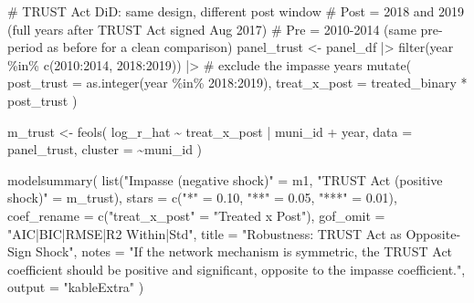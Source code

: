 \documentclass[
  11pt,
  letterpaper,
  DIV=11,
  numbers=noendperiod]{scrartcl}
\newenvironment{Shaded}{}{}
\newcommand{\AttributeTok}[1]{\textcolor[rgb]{0.84,0.23,0.29}{#1}}
\newcommand{\CommentTok}[1]{\textcolor[rgb]{0.42,0.45,0.49}{#1}}
\newcommand{\DecValTok}[1]{\textcolor[rgb]{0.00,0.36,0.77}{#1}}
\newcommand{\FloatTok}[1]{\textcolor[rgb]{0.00,0.36,0.77}{#1}}
\newcommand{\FunctionTok}[1]{\textcolor[rgb]{0.44,0.26,0.76}{#1}}
\newcommand{\NormalTok}[1]{\textcolor[rgb]{0.14,0.16,0.18}{#1}}
\newcommand{\OtherTok}[1]{\textcolor[rgb]{0.44,0.26,0.76}{#1}}
\newcommand{\SpecialCharTok}[1]{\textcolor[rgb]{0.00,0.36,0.77}{#1}}
\newcommand{\StringTok}[1]{\textcolor[rgb]{0.01,0.18,0.38}{#1}}
\begin{document}
\begin{Shaded}
\begin{Highlighting}[]
\CommentTok{\# TRUST Act DiD: same design, different post window}
\CommentTok{\# Post = 2018 and 2019 (full years after TRUST Act signed Aug 2017)}
\CommentTok{\# Pre  = 2010{-}2014 (same pre{-}period as before for a clean comparison)}
\NormalTok{panel\_trust }\OtherTok{\textless{}{-}}\NormalTok{ panel\_df }\SpecialCharTok{|\textgreater{}}
  \FunctionTok{filter}\NormalTok{(year }\SpecialCharTok{\%in\%} \FunctionTok{c}\NormalTok{(}\DecValTok{2010}\SpecialCharTok{:}\DecValTok{2014}\NormalTok{, }\DecValTok{2018}\SpecialCharTok{:}\DecValTok{2019}\NormalTok{)) }\SpecialCharTok{|\textgreater{}}  \CommentTok{\# exclude the impasse years}
  \FunctionTok{mutate}\NormalTok{(}
    \AttributeTok{post\_trust   =} \FunctionTok{as.integer}\NormalTok{(year }\SpecialCharTok{\%in\%} \DecValTok{2018}\SpecialCharTok{:}\DecValTok{2019}\NormalTok{),}
    \AttributeTok{treat\_x\_post =}\NormalTok{ treated\_binary }\SpecialCharTok{*}\NormalTok{ post\_trust}
\NormalTok{  )}

\NormalTok{m\_trust }\OtherTok{\textless{}{-}} \FunctionTok{feols}\NormalTok{(}
\NormalTok{  log\_r\_hat }\SpecialCharTok{\textasciitilde{}}\NormalTok{ treat\_x\_post }\SpecialCharTok{|}\NormalTok{ muni\_id }\SpecialCharTok{+}\NormalTok{ year,}
  \AttributeTok{data    =}\NormalTok{ panel\_trust,}
  \AttributeTok{cluster =} \SpecialCharTok{\textasciitilde{}}\NormalTok{muni\_id}
\NormalTok{)}

\FunctionTok{modelsummary}\NormalTok{(}
  \FunctionTok{list}\NormalTok{(}\StringTok{"Impasse (negative shock)"} \OtherTok{=}\NormalTok{ m1,}
       \StringTok{"TRUST Act (positive shock)"} \OtherTok{=}\NormalTok{ m\_trust),}
  \AttributeTok{stars      =} \FunctionTok{c}\NormalTok{(}\StringTok{"*"} \OtherTok{=} \FloatTok{0.10}\NormalTok{, }\StringTok{"**"} \OtherTok{=} \FloatTok{0.05}\NormalTok{, }\StringTok{"***"} \OtherTok{=} \FloatTok{0.01}\NormalTok{),}
  \AttributeTok{coef\_rename =} \FunctionTok{c}\NormalTok{(}\StringTok{"treat\_x\_post"} \OtherTok{=} \StringTok{"Treated x Post"}\NormalTok{),}
  \AttributeTok{gof\_omit   =} \StringTok{"AIC|BIC|RMSE|R2 Within|Std"}\NormalTok{,}
  \AttributeTok{title      =} \StringTok{"Robustness: TRUST Act as Opposite{-}Sign Shock"}\NormalTok{,}
  \AttributeTok{notes      =} \StringTok{"If the network mechanism is symmetric, the TRUST Act coefficient should be positive and significant, opposite to the impasse coefficient."}\NormalTok{,}
  \AttributeTok{output     =} \StringTok{"kableExtra"}
\NormalTok{)}
\end{Highlighting}
\end{Shaded}
\end{document}
